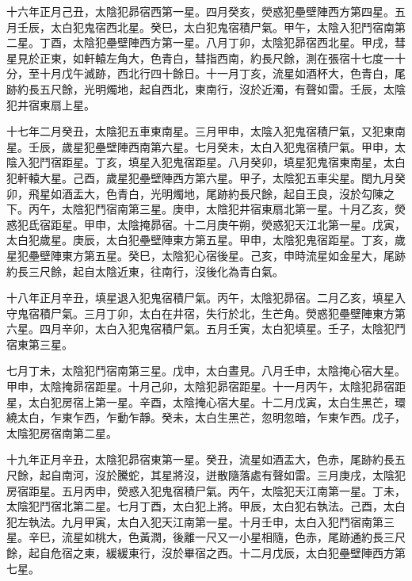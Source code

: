 \begin{pinyinscope}
 十六年正月己丑，太陰犯昴宿西第一星。四月癸亥，熒惑犯壘壁陣西方第四星。五月壬辰，太白犯鬼宿西北星。癸巳，太白犯鬼宿積尸氣。甲午，太陰入犯鬥宿南第二星。丁酉，太陰犯壘壁陣西方第一星。八月丁卯，太陰犯昴宿西北星。甲戌，彗星見於正東，如軒轅左角大，色青白，彗指西南，約長尺餘，測在張宿十七度一十分，至十月戊午滅跡，西北行四十餘日。十一月丁亥，流星如酒杯大，色青白，尾跡約長五尺餘，光明燭地，起自西北，東南行，沒於近濁，有聲如雷。壬辰，太陰犯井宿東扇上星。



 十七年二月癸丑，太陰犯五車東南星。三月甲申，太陰入犯鬼宿積尸氣，又犯東南星。壬辰，歲星犯壘壁陣西南第六星。七月癸未，太白入犯鬼宿積尸氣。甲申，太陰入犯鬥宿距星。丁亥，填星入犯鬼宿距星。八月癸卯，填星犯鬼宿東南星，太白犯軒轅大星。己酉，歲星犯壘壁陣西方第六星。甲子，太陰犯五車尖星。閏九月癸卯，飛星如酒盂大，色青白，光明燭地，尾跡約長尺餘，起自王良，沒於勾陳之下。丙午，太陰犯鬥宿南第三星。庚申，太陰犯井宿東扇北第一星。十月乙亥，熒惑犯氐宿距星。甲申，太陰掩昴宿。十二月庚午朔，熒惑犯天江北第一星。戊寅，太白犯歲星。庚辰，太白犯壘壁陣東方第五星。甲申，太陰犯鬼宿距星。丁亥，歲星犯壘壁陣東方第五星。癸巳，太陰犯心宿後星。己亥，申時流星如金星大，尾跡約長三尺餘，起自太陰近東，往南行，沒後化為青白氣。



 十八年正月辛丑，填星退入犯鬼宿積尸氣。丙午，太陰犯昴宿。二月乙亥，填星入守鬼宿積尸氣。三月丁卯，太白在井宿，失行於北，生芒角。熒惑犯壘壁陣東方第六星。四月辛卯，太白入犯鬼宿積尸氣。五月壬寅，太白犯填星。壬子，太陰犯鬥宿東第三星。



 七月丁未，太陰犯鬥宿南第三星。戊申，太白晝見。八月壬申，太陰掩心宿大星。甲申，太陰掩昴宿距星。十月己卯，太陰犯昴宿距星。十一月丙午，太陰犯昴宿距星，太白犯房宿上第一星。辛酉，太陰掩心宿大星。十二月戊寅，太白生黑芒，環繞太白，乍東乍西，乍動乍靜。癸未，太白生黑芒，忽明忽暗，乍東乍西。戊子，太陰犯房宿南第二星。



 十九年正月辛丑，太陰犯昴宿東第一星。癸丑，流星如酒盂大，色赤，尾跡約長五尺餘，起自南河，沒於騰蛇，其星將沒，迸散隨落處有聲如雷。三月庚戌，太陰犯房宿距星。五月丙申，熒惑入犯鬼宿積尸氣。丙午，太陰犯天江南第一星。丁未，太陰犯鬥宿北第二星。七月丁酉，太白犯上將。甲辰，太白犯右執法。己酉，太白犯左執法。九月甲寅，太白入犯天江南第一星。十月壬申，太白入犯鬥宿南第三星。辛巳，流星如桃大，色黃潤，後離一尺又一小星相隨，色赤，尾跡通約長三尺餘，起自危宿之東，緩緩東行，沒於畢宿之西。十二月戊辰，太白犯壘壁陣西方第七星。




\end{pinyinscope}
